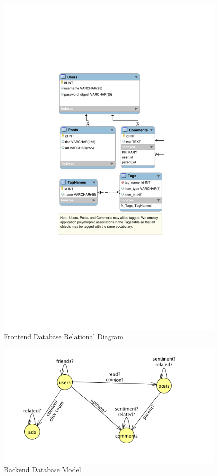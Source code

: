 \documentclass[11pt,letterpaper]{article}
\begin{document}
\begin{figure}
\centering
\includegraphics{img/db_diagram.pdf}
\caption{Frontend Database Relational Diagram}
\label{fig:database}
\end{figure}

\begin{figure}
\centering
\includegraphics{img/recsys_model.png}
\caption{Backend Database Model}
\label{fig:backend-graph}
\end{figure}
\end{document}

